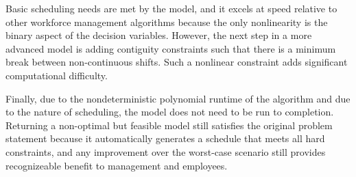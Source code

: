 Basic scheduling needs are met by the model, and it excels at speed relative to other workforce management algorithms because the only nonlinearity is the binary aspect of the decision variables. However, the next step in a more advanced model is adding contiguity constraints such that there is a minimum break between non-continuous shifts. Such a nonlinear constraint adds significant computational difficulty.

Finally, due to the nondeterministic polynomial runtime of the algorithm and due to the nature of scheduling, the model does not need to be run to completion. Returning a non-optimal but feasible model still satisfies the original problem statement because it automatically generates a schedule that meets all hard constraints, and any improvement over the worst-case scenario still provides recognizeable benefit to management and employees.


